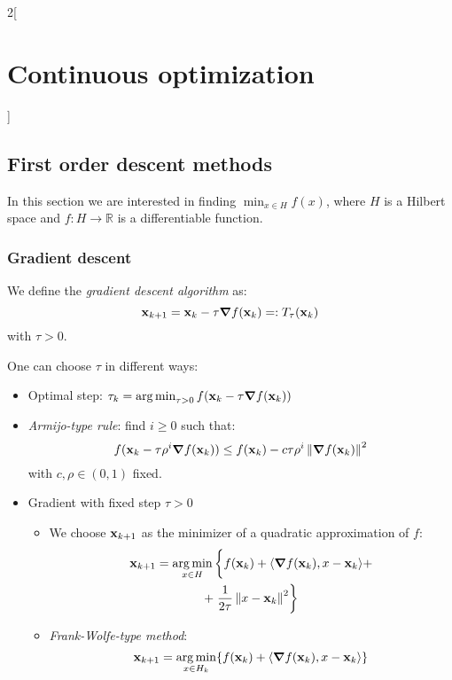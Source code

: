 \documentclass[../../../main_math.tex]{subfiles}
\begin{document}
\begin{multicols}{2}[\section{Continuous optimization}]
  \subsection{First order descent methods}
  In this section we are interested in finding $\min_{x\in H} f(x)$, where $H$ is a Hilbert space and $f:H\rightarrow \mathbb{R}$ is a differentiable function.
  \subsubsection{Gradient descent}
  \begin{definition}
    We define the \emph{gradient descent algorithm} as:
    \begin{equation*}
      \boldsymbol{\mathrm{x}}_{k+1}=\boldsymbol{\mathrm{x}}_k-\tau \grad f(\boldsymbol{\mathrm{x}}_k)=:T_\tau(\boldsymbol{\mathrm{x}}_k)
    \end{equation*}
    with $\tau>0$.
  \end{definition}
  \begin{definition}
    One can choose $\tau$ in different ways:
    \begin{itemize}
      \item Optimal step: $\tau_k=\operatorname*{arg\,min}_{\tau>0} f(\boldsymbol{\mathrm{x}}_k-\tau \grad f(\boldsymbol{\mathrm{x}}_k))$
      \item \emph{Armijo-type rule}: find $i\geq 0$ such that:
            $$
              f(\boldsymbol{\mathrm{x}}_k-\tau\rho^i \grad f(\boldsymbol{\mathrm{x}}_k))\leq f(\boldsymbol{\mathrm{x}}_k)-c \tau \rho^i \left\|\grad f(\boldsymbol{\mathrm{x}}_k)\right\|^2
            $$
            with $c,\rho\in (0,1)$ fixed.
      \item Gradient with fixed step $\tau>0$
            \begin{itemize}
              \item We choose $\boldsymbol{\mathrm{x}}_{k+1}$ as the minimizer of a quadratic approximation of $f$:
                    \begin{multline*}
                      \boldsymbol{\mathrm{x}}_{k+1}=\operatorname*{arg\,min}_{x\in H} \bigg\{ f(\boldsymbol{\mathrm{x}}_k)+\langle \grad f(\boldsymbol{\mathrm{x}}_k),x-\boldsymbol{\mathrm{x}}_k\rangle+\\+\left.\frac{1}{2\tau}\left\|x-\boldsymbol{\mathrm{x}}_k\right\|^2 \right\}
                    \end{multline*}
              \item \emph{Frank-Wolfe-type method}:
                    $$
                      \boldsymbol{\mathrm{x}}_{k+1}=\operatorname*{arg\,min}_{x\in H_k} \{ f(\boldsymbol{\mathrm{x}}_k)+\langle \grad f(\boldsymbol{\mathrm{x}}_k),x-\boldsymbol{\mathrm{x}}_k\rangle \}
$$
\end{itemize}
\end{itemize}
\end{definition}
\end{multicols}
\end{document}
